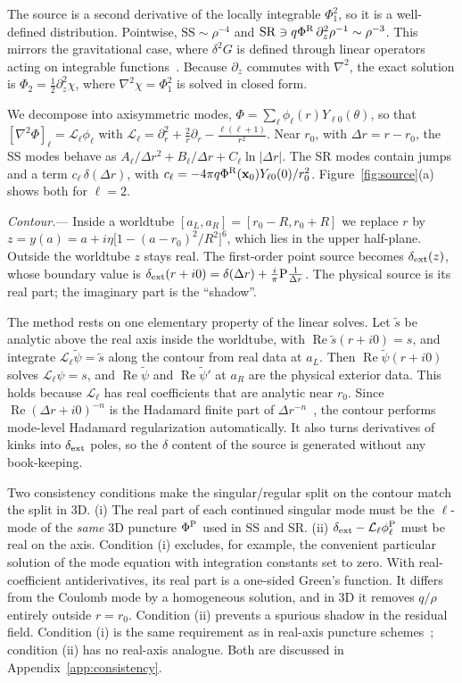 \documentclass[aps,prl,twocolumn,superscriptaddress,nofootinbib,floatfix]{revtex4-2}
\renewcommand{\Re}{\operatorname{Re}}
\newcommand{\dext}{\delta_{\rm ext}}
\newcommand{\PhiP}{\Phi^{\rm P}}
\newcommand{\PhiR}{\Phi^{\rm R}}
\newcommand{\x}{\mathbf{x}}
\newcommand{\Lop}{\mathcal{L}_\ell}
\begin{document}
The source is a second derivative of the locally integrable $\Phi_1^2$, so it is a well-defined distribution.
Pointwise, $\mathrm{SS}\sim\rho^{-4}$ and $\mathrm{SR}\ni q\PhiR\,\partial_z^2\rho^{-1}\sim\rho^{-3}$.
This mirrors the gravitational case, where $\delta^2G$ is defined through linear operators acting on integrable functions~\cite{MusaeusPoundUpton2026}.
Because $\partial_z$ commutes with $\nabla^2$, the exact solution is $\Phi_2=\tfrac12\partial_z^2\chi$, where $\nabla^2\chi=\Phi_1^2$ is solved in closed form.

We decompose into axisymmetric modes, $\Phi=\sum_\ell\phi_\ell(r)Y_{\ell0}(\theta)$, so that $[\nabla^2\Phi]_\ell=\Lop\phi_\ell$ with $\Lop=\partial_r^2+\tfrac2r\partial_r-\tfrac{\ell(\ell+1)}{r^2}$.
Near $r_0$, with $\Delta r=r-r_0$, the SS modes behave as $A_\ell/\Delta r^2+B_\ell/\Delta r+C_\ell\ln|\Delta r|$.
The SR modes contain jumps and a term $c_\ell\,\delta(\Delta r)$, with $c_\ell=-4\pi q\PhiR(\x_0)Y_{\ell0}(0)/r_0^2$.
Figure~\ref{fig:source}(a) shows both for $\ell=2$.

\emph{Contour.}---%
Inside a worldtube $[a_L,a_R]=[r_0-R,r_0+R]$ we replace $r$ by $z=y(a)=a+i\eta\big[1-(a-r_0)^2/R^2\big]^6$, which lies in the upper half-plane.
Outside the worldtube $z$ stays real.
The first-order point source becomes $\dext(z)$, whose boundary value is $\dext(r+i0)=\delta(\Delta r)+\tfrac{i}{\pi}\mathrm{P}\tfrac{1}{\Delta r}$.
The physical source is its real part; the imaginary part is the ``shadow''.

The method rests on one elementary property of the linear solves.
Let $\tilde s$ be analytic above the real axis inside the worldtube, with $\Re\tilde s(r+i0)=s$, and integrate $\Lop\tilde\psi=\tilde s$ along the contour from real data at $a_L$.
Then $\Re\tilde\psi(r+i0)$ solves $\Lop\psi=s$, and $\Re\tilde\psi$ and $\Re\tilde\psi'$ at $a_R$ are the physical exterior data.
This holds because $\Lop$ has real coefficients that are analytic near $r_0$.
Since $\Re(\Delta r+i0)^{-n}$ is the Hadamard finite part of $\Delta r^{-n}$~\cite{GelfandShilov}, the contour performs mode-level Hadamard regularization automatically.
It also turns derivatives of kinks into $\dext$ poles, so the $\delta$ content of the source is generated without any book-keeping.

Two consistency conditions make the singular/regular split on the contour match the split in 3D.
(i) The real part of each continued singular mode must be the $\ell$-mode of the \emph{same} 3D puncture $\PhiP$ used in SS and SR.
(ii) $\dext-\Lop\phi^{\rm P}_\ell$ must be real on the axis.
Condition (i) excludes, for example, the convenient particular solution of the mode equation with integration constants set to zero.
With real-coefficient antiderivatives, its real part is a one-sided Green's function. It differs from the Coulomb mode by a homogeneous solution, and in 3D it removes $q/\rho$ entirely outside $r=r_0$.
Condition (ii) prevents a spurious shadow in the residual field.
Condition (i) is the same requirement as in real-axis puncture schemes~\cite{Upton2026}; condition (ii) has no real-axis analogue.
Both are discussed in Appendix~\ref{app:consistency}.
\end{document}
